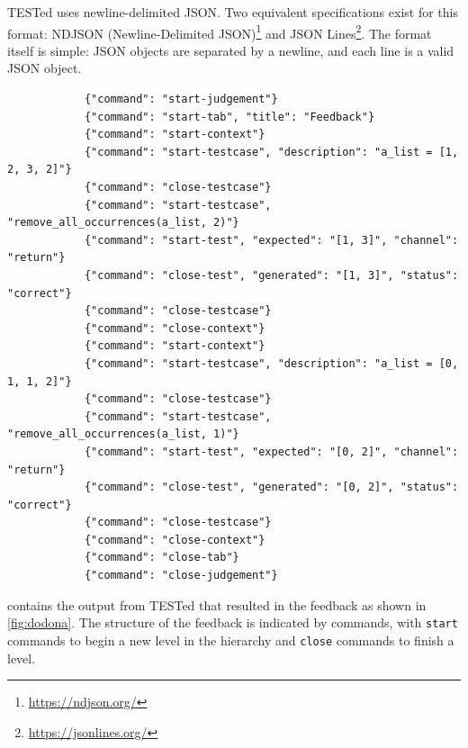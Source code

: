 \documentclass[../main]{subfiles}
\begin{document}
TESTed uses newline-delimited JSON\@.
Two equivalent specifications exist for this format: NDJSON (Newline-Delimited JSON)\footnote{\url{https://ndjson.org/}} and JSON Lines\footnote{\url{https://jsonlines.org/}}.
The format itself is simple: JSON objects are separated by a newline, and each line is a valid JSON object.

\begin{listing}
    \begin{wide}
        \begin{verbatim}
            {"command": "start-judgement"}
            {"command": "start-tab", "title": "Feedback"}
            {"command": "start-context"}
            {"command": "start-testcase", "description": "a_list = [1, 2, 3, 2]"}
            {"command": "close-testcase"}
            {"command": "start-testcase", "remove_all_occurrences(a_list, 2)"}
            {"command": "start-test", "expected": "[1, 3]", "channel": "return"}
            {"command": "close-test", "generated": "[1, 3]", "status": "correct"}
            {"command": "close-testcase"}
            {"command": "close-context"}
            {"command": "start-context"}
            {"command": "start-testcase", "description": "a_list = [0, 1, 1, 2]"}
            {"command": "close-testcase"}
            {"command": "start-testcase", "remove_all_occurrences(a_list, 1)"}
            {"command": "start-test", "expected": "[0, 2]", "channel": "return"}
            {"command": "close-test", "generated": "[0, 2]", "status": "correct"}
            {"command": "close-testcase"}
            {"command": "close-context"}
            {"command": "close-tab"}
            {"command": "close-judgement"}
        \end{verbatim}
    \end{wide}
    \caption{
        Example of the output generated by TESTed, which is rendered in \cref{fig:dodona}.
        As before, each context consists of two test cases, the first of which has no explicit tests, while the second has one test (the expected return value).
    }
    \label{lst:tested-output-example}
\end{listing}

 contains the output from TESTed that resulted in the feedback as shown in \cref{fig:dodona}.
The structure of the feedback is indicated by commands, with \texttt{start} commands to begin a new level in the hierarchy and \texttt{close} commands to finish a level.
\end{document}

